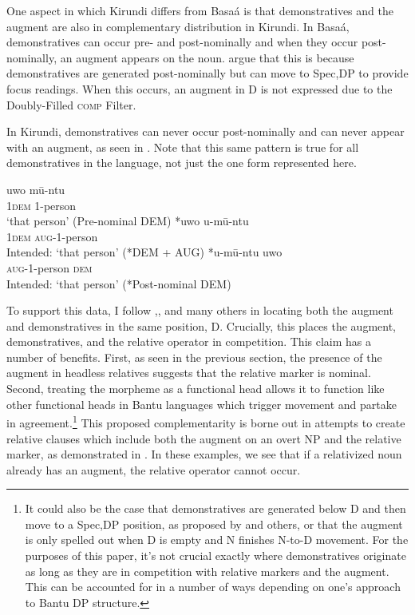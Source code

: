 \documentclass[output=paper,colorlinks,citecolor=brown
]{langscibook}
\begin{document}
One aspect in which Kirundi differs from Basaá is that demonstratives and the augment are also in complementary distribution in Kirundi. In Basaá, demonstratives can occur pre- and post-nominally and when they occur post-nominally, an augment appears on the noun. \citet{Jenksetal:2017} argue that this is because demonstratives are generated post-nominally but can move to Spec,DP to provide focus readings. When this occurs, an augment in D is not expressed due to the Doubly-Filled \textsc{comp} Filter.

In Kirundi, demonstratives can never occur post-nominally and can never appear with an augment, as seen in . Note that this same pattern is true for all demonstratives in the language, not just the one form represented here.

\ea  \label{ex:myers:dempost}
\begin{xlist}
    \ex \gll {}uwo mū-ntu\\
    \textsc{1dem} 1-person\\
    \glt {}`that person' \hfill{(Pre-nominal DEM)}
    \ex \gll {}*uwo u-mū-ntu\\
    \textsc{1dem} \textsc{aug}-1-person\\
    \glt {}Intended: `that person' \hfill{(*DEM + AUG)}
     \ex \gll {}*u-mū-ntu uwo\\
   \textsc{aug}-1-person   \textsc{dem}\\
    \glt {}Intended: `that person' \hfill{(*Post-nominal DEM)}
\end{xlist}
\z

\noindent To support this data, I follow \citet{Ndayiragijeetal:2012},\citet{CarstensMletshe:2016}, \citet{Gambarage:2019} and many others in locating both the augment and demonstratives in the same position, D. Crucially, this places the augment, demonstratives, and the relative operator in competition. This claim has a number of benefits. First, as seen in the previous section, the presence of the augment in headless relatives suggests that the relative marker is nominal. Second, treating the morpheme as a functional head allows it to function like other functional heads in Bantu languages which trigger movement and partake in agreement.\footnote{It could also be the case that demonstratives are generated below D and then move to a Spec,DP position, as proposed by \citet{Carstens:1991} and others, or that the augment is only spelled out when D is empty and N finishes N-to-D movement. For the purposes of this paper, it's not crucial exactly where demonstratives originate as long as they are in competition with relative markers and the augment. This can be accounted for in a number of ways depending on one's approach to Bantu DP structure.} This proposed complementarity is borne out in attempts to create relative clauses which include both the augment \textendash{} on an overt NP \textendash{} and the relative marker, as demonstrated in . In these examples, we see that if a relativized noun already has an augment, the relative operator cannot occur.
\end{document}
